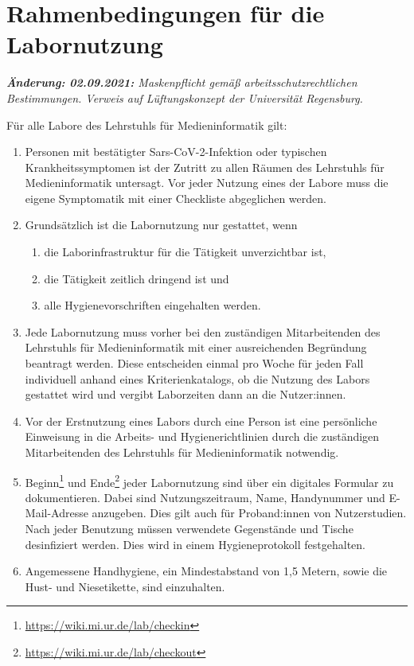 \section{Rahmenbedingungen für die Labornutzung}\label{sec:allgemein}
\emph{\textbf{Änderung: 02.09.2021:} Maskenpflicht gemäß arbeitsschutzrechtlichen Bestimmungen. Verweis auf Lüftungskonzept der Universität Regensburg.}

\noindent
Für alle Labore des Lehrstuhls für Medieninformatik gilt:

\begin{enumerate}
    \item{Personen mit bestätigter Sars-CoV-2-Infektion oder typischen Krankheitssymptomen ist der Zutritt zu allen Räumen des Lehrstuhls für Medieninformatik untersagt. Vor jeder Nutzung eines der Labore muss die eigene Symptomatik mit einer Checkliste abgeglichen werden.}
    \item Grundsätzlich ist die Labornutzung nur gestattet, wenn
    \begin{enumerate}
        \item die Laborinfrastruktur für die Tätigkeit unverzichtbar ist,
        \item die Tätigkeit zeitlich dringend ist und 
        \item alle Hygienevorschriften eingehalten werden.
    \end{enumerate}
    \item{Jede Labornutzung muss vorher bei den zuständigen Mitarbeitenden des Lehrstuhls für Medieninformatik mit einer ausreichenden Begründung beantragt werden. Diese entscheiden einmal pro Woche für jeden Fall individuell anhand eines Kriterienkatalogs, ob die Nutzung des Labors gestattet wird und vergibt Laborzeiten dann an die Nutzer:innen.}
    \item{Vor der Erstnutzung eines Labors durch eine Person ist eine persönliche Einweisung in die Arbeits- und Hygienerichtlinien durch die zuständigen Mitarbeitenden des Lehrstuhls für Medieninformatik notwendig.}
    \item{Beginn\footnote{\url{https://wiki.mi.ur.de/lab/checkin}} und Ende\footnote{\url{https://wiki.mi.ur.de/lab/checkout}} jeder Labornutzung sind über ein digitales Formular zu dokumentieren.
    Dabei sind Nutzungszeitraum, Name, Handynummer und E-Mail-Adresse anzugeben.
    Dies gilt auch für Proband:innen von Nutzerstudien.
    Nach jeder Benutzung müssen verwendete Gegenstände und Tische desinfiziert werden.
    Dies wird in einem Hygieneprotokoll festgehalten.}
    \item{Angemessene Handhygiene, ein Mindestabstand von 1,5 Metern, sowie die Hust- und Niesetikette, sind einzuhalten.

}
\end{enumerate}
